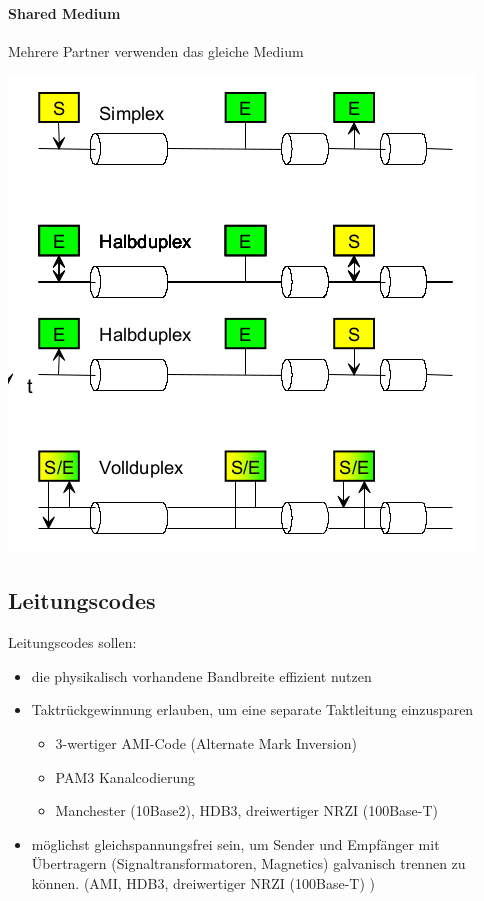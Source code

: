 \paragraph{Shared Medium }{
    {Mehrere Partner verwenden das gleiche Medium   \\}

    \includegraphics[scale=.25]{img/kopplung_2.png}

}


\subsection{Leitungscodes}{
    Leitungscodes sollen:

    \begin{itemize}[noitemsep]
        \item die physikalisch vorhandene Bandbreite effizient nutzen
        \item Taktrückgewinnung erlauben, um eine separate Taktleitung einzusparen
              \begin{itemize}[noitemsep]
                  \item 3-wertiger AMI-Code (Alternate Mark Inversion)
                  \item PAM3 Kanalcodierung
                  \item Manchester (10Base2), HDB3, dreiwertiger NRZI (100Base-T)
              \end{itemize}
        \item möglichst gleichspannungsfrei sein, um Sender und Empfänger mit Übertragern (Signaltransformatoren, Magnetics) galvanisch trennen zu können.
              (AMI, HDB3, dreiwertiger NRZI (100Base-T) )
    \end{itemize}
}

